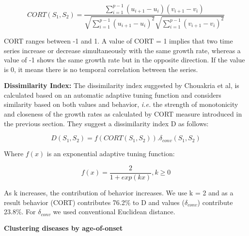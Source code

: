 \documentclass[12pt,twoside]{unicam}
\begin{document}
\begin{equation}
    CORT(S_1,S_2) = \dfrac{\sum_{i=1}^{p-1}{(u_{i+1}-u_i)(v_{i+1}-v_i)}}{\sqrt{\sum_{i=1}^{p-1}{(u_{i+1}-u_i)^2}}\sqrt{\sum_{i=1}^{p-1}{(v_{i+1}-v_i)^2}}}
  \label{eq:discort}
\end{equation}

CORT ranges between -1 and 1. A value of CORT = 1 implies that two time series increase or decrease simultaneously with the same growth rate, whereas a value of -1 shows the same growth rate but in the opposite direction. If the value is 0, it means there is no temporal correlation between the series.

\textbf{Dissimilarity Index:} The dissimilarity index suggested by Chouakria et al, is calculated based on an automatic adaptive tuning function and considers similarity based on both values and behavior, \emph{i.e.} the strength of monotonicity and closeness of the growth rates as calculated by CORT measure introduced in the previous section. They suggest a dissimilarity index D as follows:

\begin{equation}
    D(S_1,S_2)=f(CORT(S_1,S_2)).\delta_{conv}(S_1,S_2)
  \label{eq:disdissimilarity}
\end{equation}

Where \(f(x)\) is an exponential adaptive tuning function:

\begin{equation}
    f(x) = \dfrac{2}{1+exp(kx)}, k≥0
  \label{eq:disexpadaptivetuning}
\end{equation}

As k increases, the contribution of behavior increases. We use k = 2 and as a result behavior (CORT) contributes 76.2\% to D and values (\(\delta_{conv}\)) contribute 23.8\%. For \(\delta_{conv}\) we used conventional Euclidean distance.

\textbf{Clustering diseases by age-of-onset}
\end{document}
